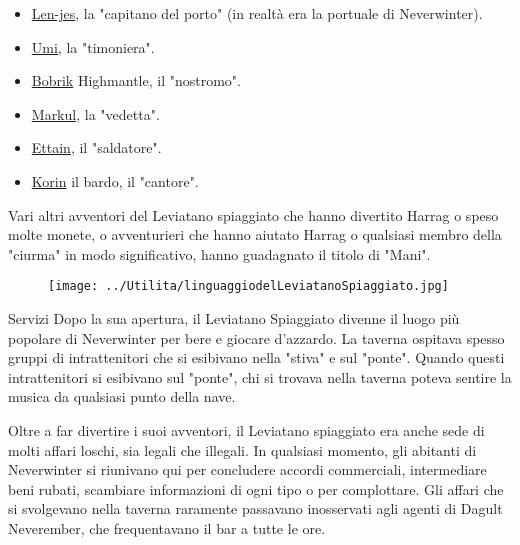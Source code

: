 \documentclass{article}
\begin{document}
\begin{itemize}
    \item \hyperlink{len}{Len-jes}, la "capitano del porto" (in realtà era la portuale di Neverwinter).
    \item \hyperlink{umi}{Umi}, la "timoniera".
    \item \hyperlink{bob}{Bobrik} Highmantle, il "nostromo".
    \item \hyperlink{mark}{Markul}, la "vedetta".
    \item \hyperlink{et}{Ettain}, il "saldatore".
    \item \hyperlink{kor}{Korin} il bardo, il "cantore".
\end{itemize}

Vari altri avventori del Leviatano spiaggiato che hanno divertito Harrag o speso molte monete, o avventurieri che hanno aiutato Harrag o qualsiasi membro della "ciurma" in modo significativo, hanno guadagnato il titolo di "Mani".

\begin{figure}[h]
    \centering
     \texttt{[image: ../Utilita/linguaggiodelLeviatanoSpiaggiato.jpg]}
\end{figure}

Servizi\newline
Dopo la sua apertura, il Leviatano Spiaggiato divenne il luogo più popolare di Neverwinter per bere e giocare d'azzardo. La taverna ospitava spesso gruppi di intrattenitori che si esibivano nella "stiva" e sul "ponte". Quando questi intrattenitori si esibivano sul "ponte", chi si trovava nella taverna poteva sentire la musica da qualsiasi punto della nave.

Oltre a far divertire i suoi avventori, il Leviatano spiaggiato era anche sede di molti affari loschi, sia legali che illegali. In qualsiasi momento, gli abitanti di Neverwinter si riunivano qui per concludere accordi commerciali, intermediare beni rubati, scambiare informazioni di ogni tipo o per complottare. Gli affari che si svolgevano nella taverna raramente passavano inosservati agli agenti di Dagult Neverember, che frequentavano il bar a tutte le ore.
\end{document}
